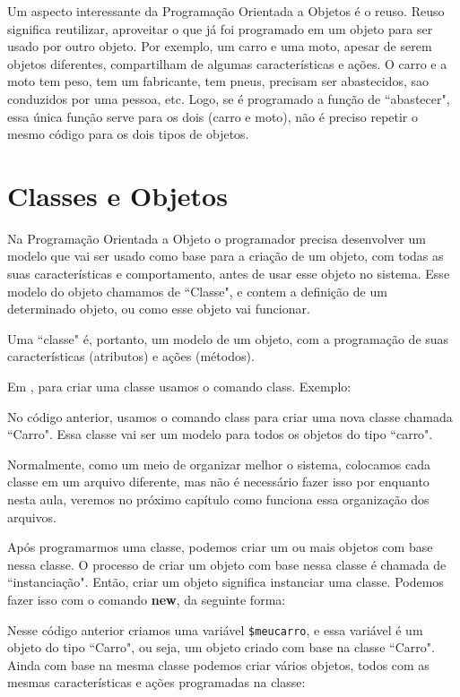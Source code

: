 Um aspecto interessante da Programação Orientada a Objetos é o reuso. Reuso significa 
reutilizar, aproveitar o que já foi programado em um objeto para ser usado por outro objeto. 
Por exemplo, um carro e uma moto, apesar de serem objetos diferentes, compartilham de algumas 
características e ações. O carro e a moto tem peso, tem um fabricante, tem pneus, precisam 
ser abastecidos, sao conduzidos por uma pessoa, etc. Logo, se é programado a função de 
``abastecer", essa única função serve para os dois (carro e moto), não é preciso repetir 
o mesmo código para os dois tipos de objetos.


\section{Classes e Objetos}
\label{classes-e-objetos}

Na Programação Orientada a Objeto o programador precisa desenvolver um modelo que vai ser 
usado como base para a criação de um objeto, com todas as suas características e comportamento, 
antes de usar esse objeto no sistema. Esse modelo do objeto chamamos de ``Classe", e contem 
a definição de um determinado objeto, ou como esse objeto vai funcionar. 

Uma ``classe" é, portanto, um modelo de um objeto, com a programação de suas características 
(atributos) e ações (métodos).

Em \php, para criar uma classe usamos o comando class. Exemplo:



No código anterior, usamos o comando class para criar uma nova classe chamada ``Carro". Essa 
classe vai ser um modelo para todos os objetos do tipo ``carro". 

Normalmente, como um meio de organizar melhor o sistema, colocamos cada classe em um arquivo \php 
diferente, mas não é necessário fazer isso por enquanto nesta aula, veremos no próximo capítulo 
como funciona essa organização dos arquivos.

Após programarmos uma classe, podemos criar um ou mais objetos com base nessa classe. O processo 
de criar um objeto com base nessa classe é chamada de ``instanciação". Então, criar um objeto 
significa instanciar uma classe. Podemos fazer isso com o comando \textbf{new}, da seguinte 
forma:



Nesse código anterior criamos uma variável \texttt{\$meucarro}, e essa variável é um objeto 
do tipo ``Carro", ou seja, um objeto criado com base na classe ``Carro". Ainda com base na mesma 
classe podemos criar vários objetos, todos com as mesmas características e ações programadas 
na classe:

